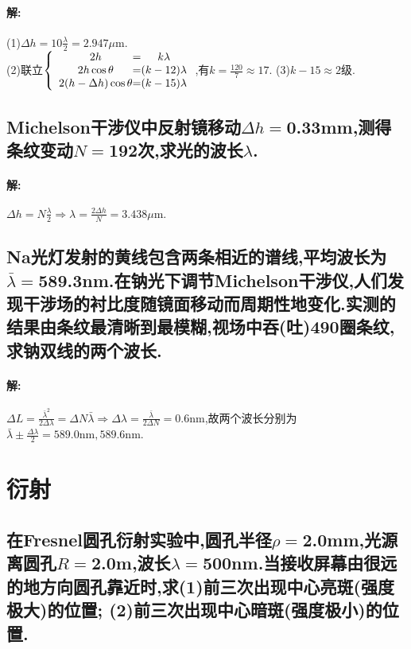 \documentclass[UTF8]{article}
\newcommand{\m}{\mathrm{m}}
\newcommand{\nm}{\mathrm{nm}}
\begin{document}
    \paragraph{解: }(1)$\Delta h=10\frac{\lambda}{2}=2.947\mu\m$.\\ 
    (2)联立$\left\{ \begin{array}{c@{=}c}
        2h&k\lambda\\ 2h\cos \theta&(k-12)\lambda\\ 2(h-\Delta h)\cos \theta & (k-15)\lambda
    \end{array} \right.$,有$k=\frac{120}{7}\approx 17$. (3)$k-15\approx 2$级.

    \subsection{Michelson干涉仪中反射镜移动$\Delta h=$0.33mm,测得条纹变动$N=$192次,求光的波长$\lambda$.} %
    \paragraph{解: }$\Delta h=N\frac{\lambda}{2}\Rightarrow \lambda=\frac{2\Delta h}{N}=3.438\mu \m.$

    \subsection{Na光灯发射的黄线包含两条相近的谱线,平均波长为$\bar{\lambda}=$589.3nm.在钠光下调节Michelson干涉仪,人们发现干涉场的衬比度随镜面移动而周期性地变化.实测的结果由条纹最清晰到最模糊,视场中吞(吐)490圈条纹,求钠双线的两个波长.} %
    \paragraph{解: }$\Delta L=\frac{\bar{\lambda}^2}{2\Delta \lambda}=\Delta N\bar{\lambda}\Rightarrow \Delta \lambda=\frac{\bar{\lambda}}{2\Delta N}=0.6\nm$,故两个波长分别为$\bar{\lambda}\pm \frac{\Delta \lambda}{2}=589.0\nm,589.6\nm$.

    \section{衍射}
    \subsection{在Fresnel圆孔衍射实验中,圆孔半径$\rho=$2.0mm,光源离圆孔$R=$2.0m,波长$\lambda=$500nm.当接收屏幕由很远的地方向圆孔靠近时,求(1)前三次出现中心亮斑(强度极大)的位置; (2)前三次出现中心暗斑(强度极小)的位置.} %
\end{document}
